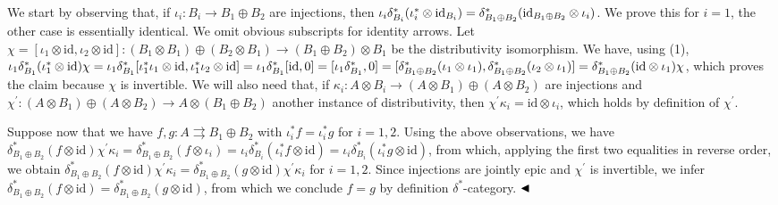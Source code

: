 \documentclass[10pt,a4paper]{amsart}
\begin{document}
We start by observing that, if $\iota_{i}:B_{i}\to B_{1}\oplus B_{2}$ are injections, then $\iota_{i}\delta^{\ast}_{B_{i}}(\iota^{\ast}_{i}\otimes\mathrm{id}_{B_{i}})=%
\delta^{\ast}_{B_{1}\oplus B_{2}}(\mathrm{id}_{B_{1}\oplus B_{2}}\otimes\iota_%
{i})$. We prove this for $i=1$, the other case is essentially identical. We omit obvious subscripts for identity arrows. Let $\chi=[\iota_{1}\otimes\mathrm{id},\iota_{2}\otimes\mathrm{id}]:(B_{1}\otimes B%
_{1})\oplus(B_{2}\otimes B_{1})\to(B_{1}\oplus B_{2})\otimes B_{1}$ be the distributivity isomorphism. We have, using (1), $\iota_{1}\delta^{\ast}_{B_{1}}(\iota^{\ast}_{1}\otimes\mathrm{id})\chi=\iota_{%
1}\delta^{\ast}_{B_{1}}[\iota^{\ast}_{1}\iota_{1}\otimes\mathrm{id},\iota^{%
\ast}_{1}\iota_{2}\otimes\mathrm{id}]=\iota_{1}\delta^{\ast}_{B_{1}}[\mathrm{%
id},0]=[\iota_{1}\delta^{\ast}_{B_{1}},0]=[\delta^{\ast}_{B_{1}\oplus B_{2}}(%
\iota_{1}\otimes\iota_{1}),\delta^{\ast}_{B_{1}\oplus B_{2}}(\iota_{2}\otimes%
\iota_{1})]=\delta^{\ast}_{B_{1}\oplus B_{2}}(\mathrm{id}\otimes\iota_{1})\chi$, which proves the claim because $\chi$ is invertible. We will also need that, if $\kappa_{i}:A\otimes B_{i}\to(A\otimes B_{1})\oplus(A\otimes B_{2})$ are injections and $\chi^{\prime}:(A\otimes B_{1})\oplus(A\otimes B_{2})\to A\otimes(B_{1}\oplus B%
_{2})$ another instance of distributivity, then $\chi^{\prime}\kappa_{i}=\mathrm{id}\otimes\iota_{i}$, which holds by definition of $\chi^{\prime}$.\par
 
 
 
Suppose now that we have $f,g:A\rightrightarrows B_{1}\oplus B_{2}$ with $\iota_{i}^{*}f=\iota_{i}^{*}g$ for $i=1,2$. Using the above observations, we have $\delta^{\ast}_{B_{1}\oplus B_{2}}(f\otimes\mathrm{id})\chi^{\prime}\kappa_{i}=%
\delta^{\ast}_{B_{1}\oplus B_{2}}(f\otimes\iota_{i})=\iota_{i}\delta^{\ast}_{B%
_{i}}(\iota^{\ast}_{i}f\otimes\mathrm{id})=\iota_{i}\delta^{\ast}_{B_{i}}(%
\iota^{\ast}_{i}g\otimes\mathrm{id})$, from which, applying the first two equalities in reverse order, we obtain $\delta^{\ast}_{B_{1}\oplus B_{2}}(f\otimes\mathrm{id})\chi^{\prime}\kappa_{i}=%
\delta^{\ast}_{B_{1}\oplus B_{2}}(g\otimes\mathrm{id})\chi^{\prime}\kappa_{i}$ for $i=1,2$. Since injections are jointly epic and $\chi^{\prime}$ is invertible, we infer $\delta^{\ast}_{B_{1}\oplus B_{2}}(f\otimes\mathrm{id})=\delta^{\ast}_{B_{1}%
\oplus B_{2}}(g\otimes\mathrm{id})$, from which we conclude $f=g$ by definition $\delta^{\ast}$-category. $\hfill\blacktriangleleft$\par
 
\end{document}
